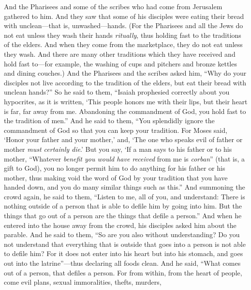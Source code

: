 \begin{biblechapter} %
 And the Pharisees and some of the scribes who had come from Jerusalem gathered to him.
\verse And they saw that some of his disciples were eating their bread with unclean—that is, unwashed—hands.
\verse (For the Pharisees and all the Jews do not eat unless they wash their hands \textit{ritually}, thus holding fast to the traditions of the elders.
\verse And when they come from the marketplace, they do not eat unless they wash. And there are many other traditions which they have received and hold fast to—for example, the washing of cups and pitchers and bronze kettles and dining couches.)
\verse And the Pharisees and the scribes asked him, “Why do your disciples not live according to the tradition of the elders, but eat their bread with unclean hands?”
\verse So he said to them, “Isaiah prophesied correctly about you hypocrites, as it is written,
\verse ‘This people honors me with their lips, 
but their heart is far, far away from me.
\verse Abandoning the commandment of God, you hold fast to the tradition of men.”
\verse And he said to them, “You splendidly ignore the commandment of God so that you can keep your tradition.
\verse For Moses said, ‘Honor your father and your mother,’ and, ‘The one who speaks evil of father or mother \textit{must certainly die}.’
\verse But you say, ‘If a man says to his father or to his mother, “Whatever \textit{benefit you would have received} from me is \textit{corban}” (that is, a gift to God),
\verse you no longer permit him to do anything for his father or his mother,
\verse thus making void the word of God by your tradition that you have handed down, and you do many similar things such as this.”
 And summoning the crowd again, he said to them, “Listen to me, all of you, and understand:
\verse There is nothing outside of a person that is able to defile him by going into him. But the things that go out of a person are the things that defile a person.”
\verse And when he entered into the house away from the crowd, his disciples asked him about the parable.
\verse And he said to them, “So are you also without understanding? Do you not understand that everything that is outside that goes into a person is not able to defile him?
\verse For it does not enter into his heart but into his stomach, and goes out into the latrine”—thus declaring all foods clean.
\verse And he said, “What comes out of a person, that defiles a person.
\verse For from within, from the heart of people, come evil plans, sexual immoralities, thefts, murders,

\end{biblechapter}
